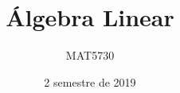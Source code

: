 \documentclass[11pt,a4paper]{article}
\title{Álgebra Linear}
\author{MAT5730}
\date{2 semestre de 2019}
\begin{document}
\maketitle
\tableofcontents
\newpage

\end{document}
